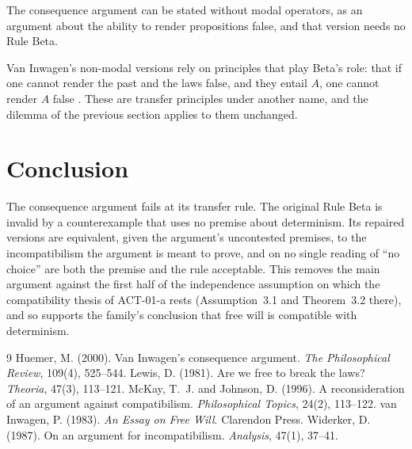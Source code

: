\documentclass{situationist-preprint}
\begin{document}
\begin{objection}
The consequence argument can be stated without modal operators, as an argument about the ability to render propositions false, and that version needs no Rule Beta.
\end{objection}

\begin{reply}
Van Inwagen's non-modal versions rely on principles that play Beta's role: that if one cannot render the past and the laws false, and they entail $A$, one cannot render $A$ false \citep{vanInwagen1983}. These are transfer principles under another name, and the dilemma of the previous section applies to them unchanged.
\end{reply}

\section{Conclusion}

The consequence argument fails at its transfer rule. The original Rule Beta is invalid by a counterexample that uses no premise about determinism. Its repaired versions are equivalent, given the argument's uncontested premises, to the incompatibilism the argument is meant to prove, and on no single reading of \enquote{no choice} are both the premise and the rule acceptable. This removes the main argument against the first half of the independence assumption on which the compatibility thesis of ACT-01-a rests (Assumption~3.1 and Theorem~3.2 there), and so supports the family's conclusion that free will is compatible with determinism.

\begin{thebibliography}{9}
 Huemer, M. (2000). Van Inwagen's consequence argument. \emph{The Philosophical Review}, 109(4), 525--544.
 Lewis, D. (1981). Are we free to break the laws? \emph{Theoria}, 47(3), 113--121.
 McKay, T.~J. and Johnson, D. (1996). A reconsideration of an argument against compatibilism. \emph{Philosophical Topics}, 24(2), 113--122.
 van Inwagen, P. (1983). \emph{An Essay on Free Will}. Clarendon Press.
 Widerker, D. (1987). On an argument for incompatibilism. \emph{Analysis}, 47(1), 37--41.
\end{thebibliography}
\end{document}
